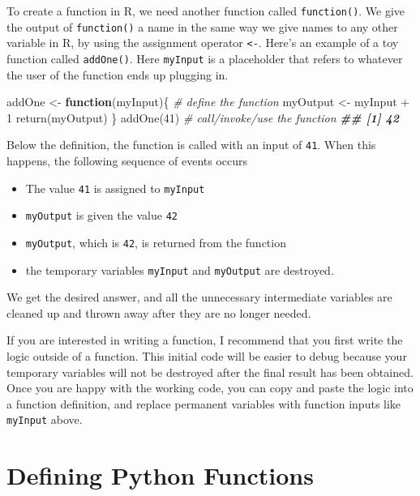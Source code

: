 \documentclass[
  12pt,
  krantz2]{krantz}
\makeatletter
\newenvironment{Shaded}{\begin{snugshade}}{\end{snugshade}}
\newcommand{\CommentTok}[1]{\textcolor[rgb]{0.37,0.37,0.37}{\textit{#1}}}
\newcommand{\ControlFlowTok}[1]{\textcolor[rgb]{0.27,0.27,0.27}{\textbf{#1}}}
\newcommand{\DecValTok}[1]{\textcolor[rgb]{0.06,0.06,0.06}{#1}}
\newcommand{\DocumentationTok}[1]{\textcolor[rgb]{0.37,0.37,0.37}{\textbf{\textit{#1}}}}
\newcommand{\FunctionTok}[1]{\textcolor[rgb]{0,0,0}{#1}}
\newcommand{\NormalTok}[1]{#1}
\newcommand{\OtherTok}[1]{\textcolor[rgb]{0.37,0.37,0.37}{#1}}
\newcommand{\SpecialCharTok}[1]{\textcolor[rgb]{0,0,0}{#1}}
\providecommand{\tightlist}{%
  \setlength{\itemsep}{0pt}\setlength{\parskip}{0pt}}
\newenvironment{kframe}{%
\medskip{}
\setlength{\fboxsep}{.8em}
 \def\at@end@of@kframe{}%
 \ifinner\ifhmode%
  \def\at@end@of@kframe{\end{minipage}}%
  \begin{minipage}{\columnwidth}%
 \fi\fi%
 \def\FrameCommand##1{\hskip\@totalleftmargin \hskip-\fboxsep
 \colorbox{shadecolor}{##1}\hskip-\fboxsep
     \hskip-\linewidth \hskip-\@totalleftmargin \hskip\columnwidth}%
 \MakeFramed {\advance\hsize-\width
   \@totalleftmargin\z@ \linewidth\hsize
   \@setminipage}}%
 {\par\unskip\endMakeFramed%
 \at@end@of@kframe}
\renewenvironment{Shaded}{\begin{kframe}}{\end{kframe}}
\makeatother
\begin{document}
To create a function in R, we need another function called \texttt{function()}. We give the output of \texttt{function()} a name in the same way we give names to any other variable in R, by using the assignment operator \texttt{\textless{}-}. Here's an example of a toy function called \texttt{addOne()}. Here \texttt{myInput} is a placeholder that refers to whatever the user of the function ends up plugging in.

\begin{Shaded}
\begin{Highlighting}[]
\NormalTok{addOne }\OtherTok{\textless{}{-}} \ControlFlowTok{function}\NormalTok{(myInput)\{  }\CommentTok{\# define the function}
\NormalTok{  myOutput }\OtherTok{\textless{}{-}}\NormalTok{ myInput }\SpecialCharTok{+} \DecValTok{1}
  \FunctionTok{return}\NormalTok{(myOutput)}
\NormalTok{\}}
\FunctionTok{addOne}\NormalTok{(}\DecValTok{41}\NormalTok{) }\CommentTok{\# call/invoke/use the function }
\DocumentationTok{\#\# [1] 42}
\end{Highlighting}
\end{Shaded}

Below the definition, the function is called with an input of \texttt{41}. When this happens, the following sequence of events occurs

\begin{itemize}
\tightlist
\item
  The value \texttt{41} is assigned to \texttt{myInput}
\item
  \texttt{myOutput} is given the value \texttt{42}
\item
  \texttt{myOutput}, which is \texttt{42}, is returned from the function
\item
  the temporary variables \texttt{myInput} and \texttt{myOutput} are destroyed.
\end{itemize}

We get the desired answer, and all the unnecessary intermediate variables are cleaned up and thrown away after they are no longer needed.

If you are interested in writing a function, I recommend that you first write the logic outside of a function. This initial code will be easier to debug because your temporary variables will not be destroyed after the final result has been obtained. Once you are happy with the working code, you can copy and paste the logic into a function definition, and replace permanent variables with function inputs like \texttt{myInput} above.

\hypertarget{defining-python-functions}{%
\section{Defining Python Functions}\label{defining-python-functions}}
\end{document}
